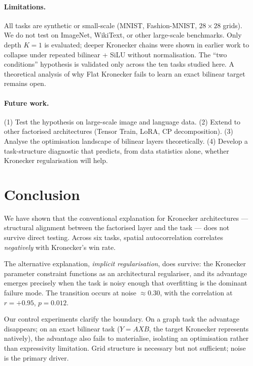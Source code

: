 \documentclass[11pt,a4paper]{article}
\begin{document}
\paragraph{Limitations.}
All tasks are synthetic or small-scale (MNIST, Fashion-MNIST,
$28 \times 28$ grids). We do not test on ImageNet, WikiText, or
other large-scale benchmarks. Only depth $K=1$ is evaluated;
deeper Kronecker chains were shown in earlier work to collapse
under repeated bilinear + SiLU without normalisation. The
``two conditions'' hypothesis is validated only across the ten
tasks studied here. A theoretical analysis of why Flat Kronecker
fails to learn an exact bilinear target remains open.

\paragraph{Future work.}
(1) Test the hypothesis on large-scale image and language data.
(2) Extend to other factorised architectures (Tensor Train, LoRA,
CP decomposition). (3) Analyse the optimisation landscape of
bilinear layers theoretically. (4) Develop a task-structure
diagnostic that predicts, from data statistics alone, whether
Kronecker regularisation will help.


\section{Conclusion}
\label{sec:conclusion}

We have shown that the conventional explanation for Kronecker
architectures --- structural alignment between the factorised
layer and the task --- does not survive direct testing. Across
six tasks, spatial autocorrelation correlates \emph{negatively}
with Kronecker's win rate.

The alternative explanation, \emph{implicit regularisation},
does survive: the Kronecker parameter constraint functions as an
architectural regulariser, and its advantage emerges precisely
when the task is noisy enough that overfitting is the dominant
failure mode. The transition occurs at noise $\approx 0.30$,
with the correlation at $r = +0.95$, $p = 0.012$.

Our control experiments clarify the boundary. On a graph task
the advantage disappears; on an exact bilinear task
($Y = AXB$, the target Kronecker represents natively), the
advantage also fails to materialise, isolating an optimisation
rather than expressivity limitation. Grid structure is
necessary but not sufficient; noise is the primary driver.
\end{document}
